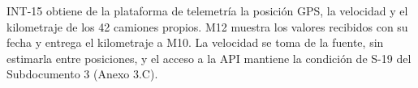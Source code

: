 INT-15 obtiene de la plataforma de telemetría la posición GPS, la velocidad y el kilometraje de los 42 camiones propios. M12 muestra los valores recibidos con su fecha y entrega el kilometraje a M10. La velocidad se toma de la fuente, sin estimarla entre posiciones, y el acceso a la API mantiene la condición de S-19 del Subdocumento 3 (Anexo 3.C).


\label{fuente-09-anexo-4-1-h-catalogo-de-interfaces-externas-fin}
